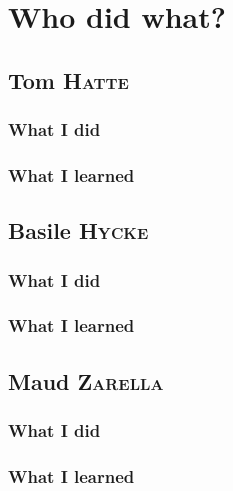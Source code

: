 \documentclass[a4paper,notitlepage]{report}
\newcommand{\authorOne}   {Tom    \textsc{Hatte}}
\newcommand{\authorTwo}   {Basile \textsc{Hycke}}
\newcommand{\authorThree} {Maud   \textsc{Zarella}}
\begin{document}
\chapter{Who did what?}

\section{\authorOne}

\subsection{What I did}

\subsection{What I learned}


\section{\authorTwo}

\subsection{What I did}

\subsection{What I learned}


\section{\authorThree}

\subsection{What I did}

\subsection{What I learned}




\printbibliography
\end{document}
